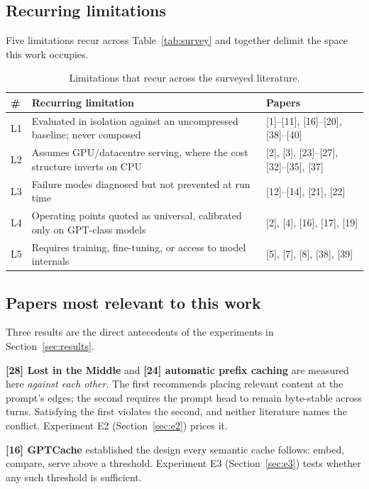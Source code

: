 \documentclass[11pt,a4paper]{article}
\begin{document}
\subsection{Recurring limitations}
\label{sec:lit-recurring}

Five limitations recur across Table~\ref{tab:survey} and together delimit the
space this work occupies.

\begin{table}[htbp]
\centering
\caption{Limitations that recur across the surveyed literature.}
\label{tab:recurring}
\footnotesize
\begin{tabularx}{\textwidth}{@{}l X l@{}}
\toprule
\textbf{\#} & \textbf{Recurring limitation} & \textbf{Papers} \\
\midrule
L1 & Evaluated in isolation against an uncompressed baseline; never composed & [1]--[11], [16]--[20], [38]--[40] \\
L2 & Assumes GPU/datacentre serving, where the cost structure inverts on CPU & [2], [3], [23]--[27], [32]--[35], [37] \\
L3 & Failure modes diagnosed but not prevented at run time & [12]--[14], [21], [22] \\
L4 & Operating points quoted as universal, calibrated only on GPT-class models & [2], [4], [16], [17], [19] \\
L5 & Requires training, fine-tuning, or access to model internals & [5], [7], [8], [38], [39] \\
\bottomrule
\end{tabularx}
\end{table}

\subsection{Papers most relevant to this work}
\label{sec:lit-relevant}

Three results are the direct antecedents of the experiments in
Section~\ref{sec:results}.

\textbf{[28] Lost in the Middle} and \textbf{[24] automatic prefix caching} are
measured here \emph{against each other}. The first recommends placing relevant
content at the prompt's edges; the second requires the prompt head to remain
byte-stable across turns. Satisfying the first violates the second, and neither
literature names the conflict. Experiment E2 (Section~\ref{sec:e2}) prices it.

\textbf{[16] GPTCache} established the design every semantic cache follows:
embed, compare, serve above a threshold. Experiment E3
(Section~\ref{sec:e3}) tests whether any such threshold is sufficient.
\end{document}

